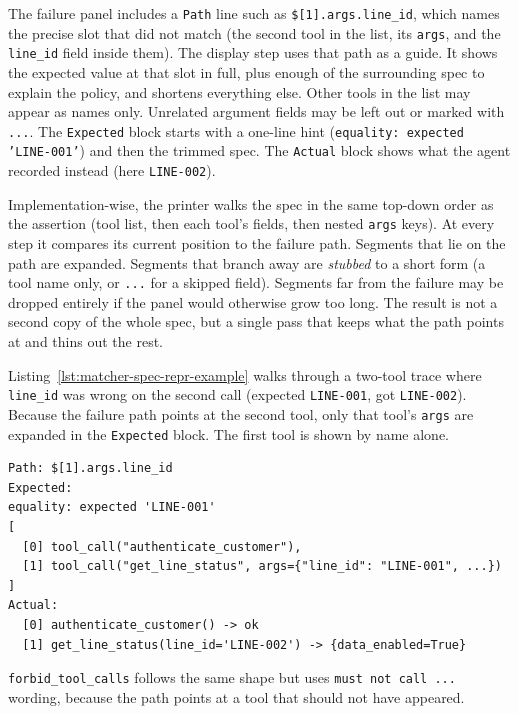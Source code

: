 The failure panel includes a \texttt{Path} line such as \texttt{\$[1].args.line\_id}, which names the precise slot that did not match (the second tool in the list, its \texttt{args}, and the \texttt{line\_id} field inside them). The display step uses that path as a guide. It shows the expected value at that slot in full, plus enough of the surrounding spec to explain the policy, and shortens everything else. Other tools in the list may appear as names only. Unrelated argument fields may be left out or marked with \texttt{...}. The \texttt{Expected} block starts with a one-line hint (\texttt{equality: expected 'LINE-001'}) and then the trimmed spec. The \texttt{Actual} block shows what the agent recorded instead (here \texttt{LINE-002}).

Implementation-wise, the printer walks the spec in the same top-down order as the assertion (tool list, then each tool's fields, then nested \texttt{args} keys). At every step it compares its current position to the failure path. Segments that lie on the path are expanded. Segments that branch away are \emph{stubbed} to a short form (a tool name only, or \texttt{...} for a skipped field). Segments far from the failure may be dropped entirely if the panel would otherwise grow too long. The result is not a second copy of the whole spec, but a single pass that keeps what the path points at and thins out the rest.

Listing~\ref{lst:matcher-spec-repr-example} walks through a two-tool trace where \texttt{line\_id} was wrong on the second call (expected \texttt{LINE-001}, got \texttt{LINE-002}). Because the failure path points at the second tool, only that tool's \texttt{args} are expanded in the \texttt{Expected} block. The first tool is shown by name alone.

\begin{lstlisting}[caption={Example failure panel excerpt: path, \texttt{Expected}, and \texttt{Actual} for a tool-argument mismatch.},label=lst:matcher-spec-repr-example,basicstyle=\listingfont]
Path: $[1].args.line_id
Expected:
equality: expected 'LINE-001'
[
  [0] tool_call("authenticate_customer"),
  [1] tool_call("get_line_status", args={"line_id": "LINE-001", ...})
]
Actual:
  [0] authenticate_customer() -> ok
  [1] get_line_status(line_id='LINE-002') -> {data_enabled=True}
\end{lstlisting}

\texttt{forbid\_tool\_calls} follows the same shape but uses \texttt{must not call ...} wording, because the path points at a tool that should not have appeared.

